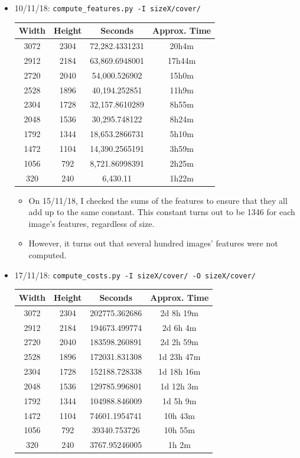 \documentclass[11pt,a4paper]{report}
\begin{document}
\begin{itemize}
\item 10/11/18: \texttt{compute\_features.py -I sizeX/cover/}
  \begin{center}
  \begin{tabular}{ c c | c c }
  Width & Height & Seconds & Approx. Time \\ \hline
  3072 & 2304 & 72,282.4331231 & 20h4m \\
  2912 & 2184 & 63,869.6948001 & 17h44m \\
  2720 & 2040 & 54,000.526902 & 15h0m \\
  2528 & 1896 & 40,194.252851 & 11h9m \\
  2304 & 1728 & 32,157.8610289 & 8h55m \\
  2048 & 1536 & 30,295.748122 & 8h24m \\
  1792 & 1344 & 18,653.2866731 & 5h10m \\
  1472 & 1104 & 14,390.2565191 & 3h59m \\
  1056 & 792 & 8,721.86998391 & 2h25m \\
  320 & 240 & 6,430.11 & 1h22m \\
  \end{tabular}
  \end{center}

  \begin{itemize}
  \item On 15/11/18, I checked the sums of the features to ensure that they all add up to the same constant. This constant turns out to be 1346 for each image's features, regardless of size.
  \item However, it turns out that several hundred images' features were not computed.
  \end{itemize}

\item 17/11/18: \texttt{compute\_costs.py -I sizeX/cover/ -O sizeX/cover/}
  \begin{center}
  \begin{tabular}{ c c | c c }
  Width & Height & Seconds & Approx. Time \\ \hline
  3072 & 2304 & 202775.362686 & 2d 8h 19m \\
  2912 & 2184 & 194673.499774 & 2d 6h 4m \\
  2720 & 2040 & 183598.260891 & 2d 2h 59m \\
  2528 & 1896 & 172031.831308 & 1d 23h 47m \\
  2304 & 1728 & 152188.728338 & 1d 18h 16m \\
  2048 & 1536 & 129785.996801 & 1d 12h 3m \\ 
  1792 & 1344 & 104988.846009 & 1d 5h 9m \\
  1472 & 1104 & 74601.1954741 & 10h 43m \\
  1056 & 792 & 39340.753726 & 10h 55m \\
  320 & 240 & 3767.95246005 & 1h 2m \\
  \end{tabular}
  \end{center}



\end{itemize}
\end{document}
